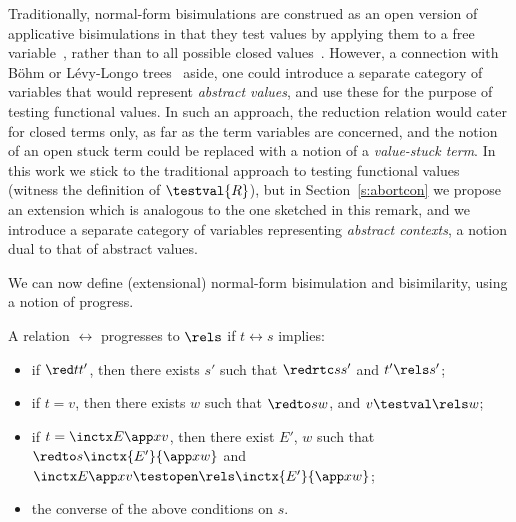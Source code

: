 \documentclass{lmcs}
\theoremstyle{defC}
\begin{document}
\vspace{2mm}
\begin{rem}%
\label{r:abstrvars}
Traditionally, normal-form bisimulations are construed as an open version of
applicative bisimulations in that they test values by applying them to a free
variable~\cite{Lassen:LICS05}, rather than to all possible closed
values~\cite{Abramsky-Ong:IaC93}. However, a connection with B{\"o}hm or
L{\'e}vy-Longo trees~\cite{Lassen:MFPS99} aside, one could introduce a separate
category of variables that would represent \emph{abstract values}, and use these
for the purpose of testing functional values. In such an approach, the reduction
relation would cater for closed terms only, as far as the term variables are
concerned, and the notion of an open stuck term could be replaced with a notion
of a \emph{value-stuck term}. In this work we stick to the traditional approach
to testing functional values (witness the definition of $\testval{R}$), but in
Section~\ref{s:abortcon} we propose an extension which is analogous to the one
sketched in this remark, and we introduce a separate category of variables
representing \emph{abstract contexts}, a notion dual to that of abstract values.
\end{rem}

\vspace{2mm} We can now define (extensional) normal-form bisimulation and
bisimilarity, using a notion of progress.
\begin{defi}%
  \label{def:nf-classic}
  A relation $\rel$ progresses to $\rels$ if $t \rel s$ implies:
  \begin{itemize}
  \item if $\red t {t'}$, then there exists $s'$ such that $\redrtc s {s'}$ and
    $t' \rels s'$;
  \item if $t=v$, then there exists $w$ such that $\redto s w$, and $v
    \testval\rels w$;
  \item if $t=\inctx E {\app x v}$, then there exist $E'$, $w$ such that $\redto
    s {\inctx {E'}{\app x w}}$ and $\inctx E {\app x v} \testopen\rels \inctx
    {E'}{\app x w}$;
  \item the converse of the above conditions on $s$.
  \end{itemize}
\end{defi}
\end{document}
